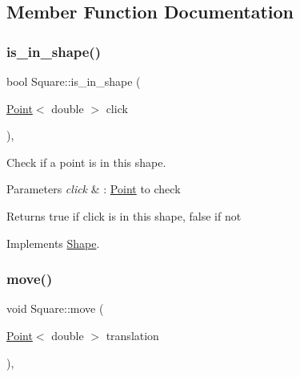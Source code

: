 \subsection{Member Function Documentation}
\mbox{\label{classSquare_a18b130131d969c53f3dfbe2b753a28d4}} 
\subsubsection{\texorpdfstring{is\+\_\+in\+\_\+shape()}{is\_in\_shape()}}
{\footnotesize\ttfamily bool Square\+::is\+\_\+in\+\_\+shape (\begin{DoxyParamCaption}\item[{\hyperlink{classPoint}{Point}$<$ double $>$}]{click }\end{DoxyParamCaption})\hspace{0.3cm}{\ttfamily [override]}, {\ttfamily [virtual]}}



Check if a point is in this shape. 


\begin{DoxyParams}{Parameters}
{\em click} & \+: \hyperlink{classPoint}{Point} to check \\
\hline
\end{DoxyParams}
\begin{DoxyReturn}{Returns}
true if click is in this shape, false if not 
\end{DoxyReturn}


Implements \hyperlink{classShape_abcce23128cd35989468a88a7194152af}{Shape}.

\mbox{\label{classSquare_a6be02369ff07934179f6bfd6360fb9d3}} 
\subsubsection{\texorpdfstring{move()}{move()}}
{\footnotesize\ttfamily void Square\+::move (\begin{DoxyParamCaption}\item[{\hyperlink{classPoint}{Point}$<$ double $>$}]{translation }\end{DoxyParamCaption})\hspace{0.3cm}{\ttfamily [override]}, {\ttfamily [virtual]}}



